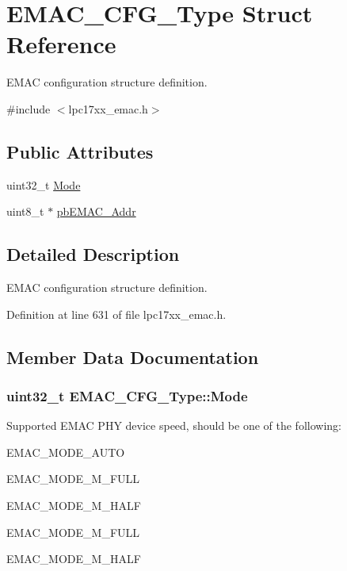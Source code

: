 \hypertarget{struct_e_m_a_c___c_f_g___type}{\section{\-E\-M\-A\-C\-\_\-\-C\-F\-G\-\_\-\-Type \-Struct \-Reference}
\label{struct_e_m_a_c___c_f_g___type}
}


\-E\-M\-A\-C configuration structure definition.  




{\ttfamily \#include $<$lpc17xx\-\_\-emac.\-h$>$}

\subsection*{\-Public \-Attributes}
\begin{DoxyCompactItemize}
\item 
uint32\-\_\-t \hyperlink{struct_e_m_a_c___c_f_g___type_ab9a885b2758331d921d38e338eff7b54}{\-Mode}
\item 
uint8\-\_\-t $\ast$ \hyperlink{struct_e_m_a_c___c_f_g___type_a70a70b7a54816afd0f73f88cf238fa22}{pb\-E\-M\-A\-C\-\_\-\-Addr}
\end{DoxyCompactItemize}


\subsection{\-Detailed \-Description}
\-E\-M\-A\-C configuration structure definition. 

\-Definition at line 631 of file lpc17xx\-\_\-emac.\-h.



\subsection{\-Member \-Data \-Documentation}
\hypertarget{struct_e_m_a_c___c_f_g___type_ab9a885b2758331d921d38e338eff7b54}{
\subsubsection[{\-Mode}]{\setlength{\rightskip}{0pt plus 5cm}uint32\-\_\-t {\bf \-E\-M\-A\-C\-\_\-\-C\-F\-G\-\_\-\-Type\-::\-Mode}}}\label{struct_e_m_a_c___c_f_g___type_ab9a885b2758331d921d38e338eff7b54}
\-Supported \-E\-M\-A\-C \-P\-H\-Y device speed, should be one of the following\-:
\begin{DoxyItemize}
\item \-E\-M\-A\-C\-\_\-\-M\-O\-D\-E\-\_\-\-A\-U\-T\-O
\item \-E\-M\-A\-C\-\_\-\-M\-O\-D\-E\-\_\-M\-\_\-\-F\-U\-L\-L
\item \-E\-M\-A\-C\-\_\-\-M\-O\-D\-E\-\_\-M\-\_\-\-H\-A\-L\-F
\item \-E\-M\-A\-C\-\_\-\-M\-O\-D\-E\-\_\-M\-\_\-\-F\-U\-L\-L
\item \-E\-M\-A\-C\-\_\-\-M\-O\-D\-E\-\_\-M\-\_\-\-H\-A\-L\-F 
\end{DoxyItemize}

